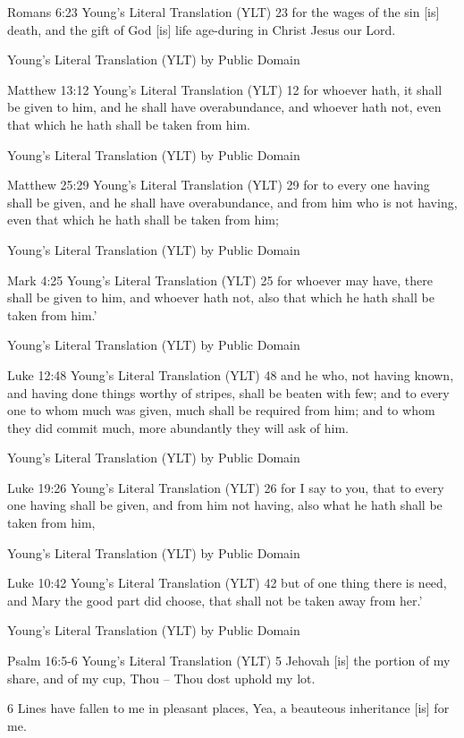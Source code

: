 \documentclass[11pt]{article}
\begin{document}
Romans 6:23 Young's Literal Translation (YLT)
23 for the wages of the sin [is] death, and the gift of God [is] life age-during in Christ Jesus our Lord.

Young's Literal Translation (YLT)
by Public Domain






Matthew 13:12 Young's Literal Translation (YLT)
12 for whoever hath, it shall be given to him, and he shall have overabundance, and whoever hath not, even that which he hath shall be taken from him.

Young's Literal Translation (YLT)
by Public Domain

Matthew 25:29 Young's Literal Translation (YLT)
29 for to every one having shall be given, and he shall have overabundance, and from him who is not having, even that which he hath shall be taken from him;

Young's Literal Translation (YLT)
by Public Domain

Mark 4:25 Young's Literal Translation (YLT)
25 for whoever may have, there shall be given to him, and whoever hath not, also that which he hath shall be taken from him.'

Young's Literal Translation (YLT)
by Public Domain

Luke 12:48 Young's Literal Translation (YLT)
48 and he who, not having known, and having done things worthy of stripes, shall be beaten with few; and to every one to whom much was given, much shall be required from him; and to whom they did commit much, more abundantly they will ask of him.

Young's Literal Translation (YLT)
by Public Domain

Luke 19:26 Young's Literal Translation (YLT)
26 for I say to you, that to every one having shall be given, and from him not having, also what he hath shall be taken from him,

Young's Literal Translation (YLT)
by Public Domain

Luke 10:42 Young's Literal Translation (YLT)
42 but of one thing there is need, and Mary the good part did choose, that shall not be taken away from her.'

Young's Literal Translation (YLT)
by Public Domain

Psalm 16:5-6 Young's Literal Translation (YLT)
5 Jehovah [is] the portion of my share, and of my cup, Thou -- Thou dost uphold my lot.

6 Lines have fallen to me in pleasant places, Yea, a beauteous inheritance [is] for me.
\end{document}
